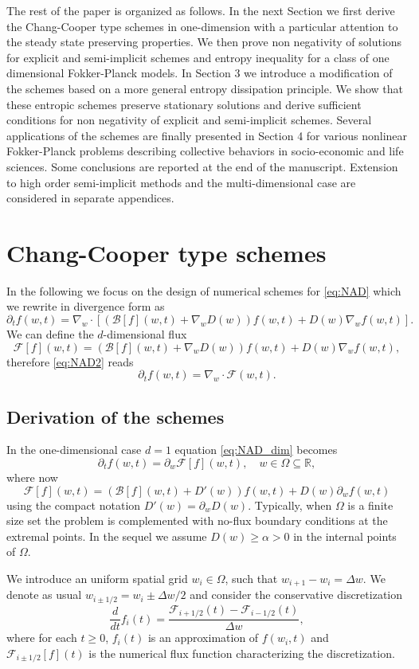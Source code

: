 \documentclass[a4paper]{article}
\theoremstyle{remark}\newtheorem{remark}{Remark}
\newcommand{\RR}{\mathbb{R}}
\newcommand{\F}{\mathcal{F}}
\newcommand{\B}{\mathcal{B}}
\newcommand{\be}{\begin{equation}}
\newcommand{\ee}{\end{equation}}
\begin{document}
The rest of the paper is organized as follows. In the next Section we first derive the Chang-Cooper type schemes in one-dimension with a particular attention to the steady state preserving properties. We then prove non negativity of solutions for explicit and semi-implicit schemes and entropy inequality for a class of one dimensional Fokker-Planck models. In Section 3 we introduce a modification of the schemes based on a more general entropy dissipation principle. We show that these entropic schemes preserve stationary solutions and derive sufficient conditions for non negativity of explicit and semi-implicit schemes. Several applications of the schemes are finally presented in Section 4 for various nonlinear Fokker-Planck problems describing collective behaviors in socio-economic and life sciences. Some conclusions are reported at the end of the manuscript. Extension to high order semi-implicit methods and the multi-dimensional case are considered in separate appendices.


\section{Chang-Cooper type schemes}\label{sec:3}
In the following we focus on the design of numerical schemes for \eqref{eq:NAD} which we rewrite in divergence form as
\be\label{eq:NAD2}
\partial_t f(w,t) = \nabla_w \cdot [(\B[f](w,t)+\nabla_w D(w))f(w,t)+D(w)\nabla_w f(w,t)].
\ee
We can define the $d$-dimensional flux 
\[
\F[f](w,t) = (\B[f](w,t)+\nabla_w D(w))f(w,t)+D(w)\nabla_w f(w,t),
\]
therefore \eqref{eq:NAD2} reads
\be\label{eq:NAD_dim}
\partial_t f(w,t) = \nabla_w \cdot \F(w,t).
\ee


\subsection{Derivation of the schemes}
In the one-dimensional case $d=1$ equation \eqref{eq:NAD_dim} becomes
\be\label{eq:FP_flux}
\partial_t f(w,t) = \partial_w \F[f](w,t),\quad w\in {\Omega} \subseteq \RR,
\ee
where now
\be
\label{eq:flux}
\F[f](w,t) = ( \B[f](w,t)+D'(w)) f(w,t)+D(w)\partial_w f(w,t)
\ee
using the compact notation $D'(w)=\partial_w D(w)$. Typically, when ${\Omega}$ is a finite size set the problem is complemented with no-flux boundary conditions at the extremal points. In the sequel we assume $D(w) \geq \alpha > 0$ in the internal points of $\Omega$. 


We introduce an uniform spatial grid $w_i \in \Omega$, such that $w_{i+1}-w_i=\Delta w$. We denote as usual $w_{i\pm 1/2}=w_i\pm \Delta w/2$ and 
consider the conservative discretization
\be\label{eq:dflux}
\frac{d}{dt}f_i(t) = \dfrac{\F_{i+1/2}(t)-\F_{i-1/2}(t)}{\Delta w},
\ee
where for each $t\ge 0$, $f_i(t)$ is an approximation of $f(w_i,t)$  and $\F_{i\pm 1/2}[f](t)$ is the numerical flux function characterizing the  discretization. 
\end{document}
